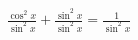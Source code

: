 \documentclass[preview]{standalone}
\begin{document}
\begin{align*}
\frac{\cos^2x}{\sin^2x} + \frac{\sin^2x}{\sin^2x} = \frac{1}{\sin^2x}
\end{align*}
\end{document}
